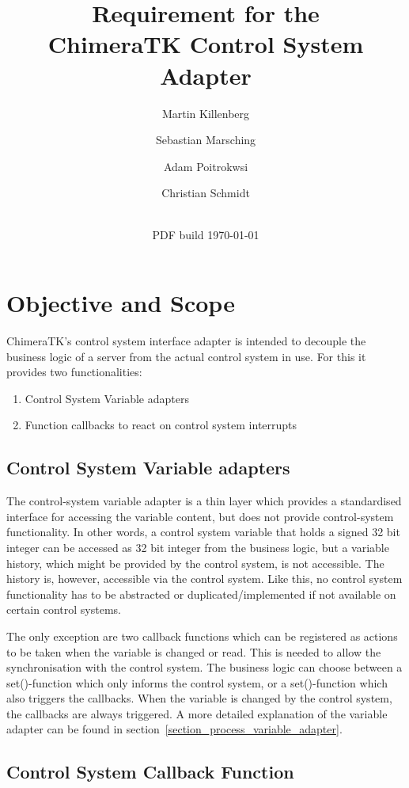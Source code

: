 \documentclass[11pt,a4paper]{scrartcl}
\title{Requirement for the\\ ChimeraTK Control System Adapter}
\date{\svnrevision\\ PDF build \today}
\author[1]{Martin Killenberg} \author[2]{Sebastian Marsching}
\author[3]{Adam Poitrokwsi}
\author[1]{Christian Schmidt}
\affil[1]{Deutsches Elektronen-Synchrotron DESY, Hamburg, Germany}
\affil[2]{aquenos GmbH, Baden-Baden, Germany}
\affil[3]{FastLogic Sp.\ z o.\ o., \L\'od\'z, Poland}
\begin{document}
\maketitle
\section{Objective and Scope}

ChimeraTK's control system interface adapter is intended to decouple the business
logic of a server from the actual control system in use. For this it provides
two functionalities: 
\begin{enumerate}
  \item Control System Variable adapters
  \item Function callbacks to react on control system interrupts
\end{enumerate}

\subsection{Control System Variable adapters}

The control-system variable adapter is a thin layer which provides a
standardised interface for accessing the variable content, but does not provide
control-system functionality. In other words, a control system variable that
holds a signed 32 bit integer can be accessed as 32 bit integer from the
business logic, but a variable history, which might be provided by the control
system, is not accessible. The history is, however, accessible via the control
system. Like this, no control system functionality has to be abstracted or
duplicated/implemented if not available on certain control systems. 

The only exception are two callback functions which can be registered as
actions to be taken when the variable is changed or read. This is needed to allow the
synchronisation with the control system. The business logic can choose between
a set()-function which only informs the control system, or a set()-function
which also triggers the callbacks. When the variable is changed by the control
system, the callbacks are always triggered. A more detailed explanation of the
variable adapter can be found in
section~\ref{section_process_variable_adapter}. 

\subsection{Control System Callback Function}
\end{document}
